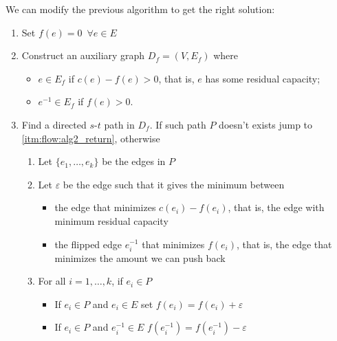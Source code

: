 \documentclass[14pt]{extarticle}
\begin{document}
We can modify the previous algorithm to get the right solution:

\begin{enumerate}
    \item Set $f(e) = 0 \enspace \forall e \in E$
    \item \label{itm:flow:alg2_iter} Construct an auxiliary graph $D_f = (V, E_f)$ where
          \begin{itemize}
              \item $e \in E_f$ if $c(e) - f(e) > 0$, that is, $e$ has some residual capacity;
              \item $e^{-1} \in E_f$ if $f(e) > 0$.
          \end{itemize}
    \item Find a directed $s$-$t$ path in $D_f$. If such path $P$ doesn't exists jump to \autoref{itm:flow:alg2_return}, otherwise
          \begin{enumerate}[label*=\arabic*.]
              \item Let $\{e_1, \ldots, e_k\}$ be the edges in $P$
              \item Let $\varepsilon$ be the edge such that it gives the minimum between
                    \begin{itemize}
                        \item the edge that minimizes $c(e_i) - f(e_i)$, that is, the edge with minimum residual capacity
                        \item the flipped edge $e^{-1}_i$ that minimizes $f(e_i)$, that is, the edge that minimizes the amount we can push back
                    \end{itemize}
              \item For all $i = 1, \ldots, k$, if $e_i \in P$
                    \begin{itemize}
                        \item If $e_i \in P$ and $e_i \in E$ set $f(e_i) = f(e_i) + \varepsilon$
                        \item If $e_i \in P$ and $e_i^{-1} \in E$ $f(e_i^{-1}) = f(e_i^{-1}) - \varepsilon$
                    \end{itemize}

\end{enumerate}
\end{enumerate}
\end{document}

